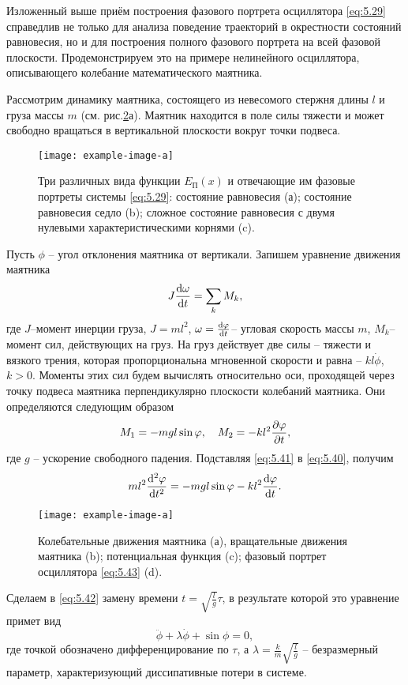  Изложенный выше приём построения фазового портрета осциллятора \eqref{eq:5.29} справедлив не только для анализа поведение траекторий в окрестности состояний равновесия, но и для построения полного фазового портрета на всей фазовой плоскости. Продемонстрируем это на примере нелинейного осциллятора, описывающего колебание математического маятника.

 Рассмотрим динамику маятника, состоящего из невесомого стержня длины $l$ и груза массы $m$ (см. рис.\ref{fig:5.8}а). Маятник находится в поле силы тяжести и может свободно вращаться в вертикальной плоскости вокруг точки подвеса.

 \begin{figure}[h]
         \centering
         \texttt{[image: example-image-a]}
         \caption{Три различных вида функции $E_{\text{П}}(x)$ и отвечающие им фазовые портреты системы \eqref{eq:5.29}: состояние равновесия (а); состояние равновесия седло (b); сложное состояние равновесия с двумя нулевыми характеристическими корнями (c).}
         \label{fig:5.7}
 \end{figure}

 Пусть $\phi$ -- угол отклонения маятника от вертикали. Запишем уравнение движения маятника
 \begin{equation}
         \label{eq:5.40}
         J \dv{\omega}{t} = \sum\limits_{k} M_k,
 \end{equation}
 где $J$--момент инерции груза, $J= ml^2$, $\omega = \dv{\varphi}{t}$-- угловая скорость массы $m$, $M_k$-- момент сил, действующих на груз. На груз действует две силы -- тяжести и вязкого трения, которая пропорциональна мгновенной скорости и равна -- $k l \dot \phi$, $k>0$. Моменты этих сил будем вычислять относительно оси, проходящей через точку подвеса маятника перпендикулярно плоскости колебаний маятника. Они определяются следующим образом
 \begin{equation}
         \label{eq:5.41}
         M_1 = - mgl \sin \varphi, \quad M_2 = - kl^2 \pdv{\varphi}{t},
 \end{equation}
 где $g$ -- ускорение свободного падения. Подставляя \eqref{eq:5.41} в \eqref{eq:5.40}, получим
 \begin{equation}
         \label{eq:5.42}
         ml^2 \dv[2]{\varphi}{t} = - mgl\sin \varphi - kl^2 \dv{\varphi}{t}.
 \end{equation}
 \begin{figure}[h]
         \centering
         \texttt{[image: example-image-a]}
         \caption{Колебательные движения маятника (а), вращательные движения маятника (b); 
         потенциальная функция (c); фазовый портрет осциллятора \eqref{eq:5.43} (d).}
         \label{fig:5.8}
 \end{figure}
 Сделаем в \eqref{eq:5.42} замену времени $t = \sqrt{ \frac{l}{g}} \tau$, в результате которой это уравнение примет вид
 \begin{equation}
         \label{eq:5.43}
         \ddot \phi + \lambda \dot \phi + \sin \phi =0,
 \end{equation}
 где точкой обозначено дифференцирование по $\tau$, а $\lambda = \frac{k}{m} \sqrt{ \frac{l}{g}}$
-- безразмерный параметр, характеризующий диссипативные потери в системе.

